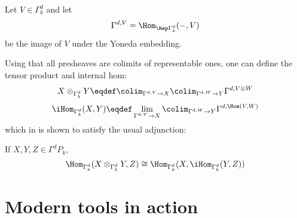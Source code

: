 \documentclass[12pt]{article}
\begin{document}
		Let $V\in \Gamma^d_k$ and let
		\[\Gamma^{d,V}=\Hom_{\Rep\Gamma^d_k}(-,V)\]
		be the image of $V$ under the Yoneda embedding.

		Using that all presheaves are colimits of representable ones, one can define the tensor product and internal hom:
		\[X\otimes_{\Gamma^d_k}Y\eqdef \colim_{\Gamma^{d,V}\to X}\colim_{\Gamma^{d,W}\to Y}\Gamma^{d,V\otimes W}\]
		\[\iHom_{\Gamma^d_k}(X,Y)\eqdef \lim_{\Gamma^{d,V}\to X}\colim_{\Gamma^{d,W}\to Y}\Gamma^{d,\Hom(V,W)}\]
		which in \cite[prop 2.4]{krause-strict-poly-func} is shown to satisfy the usual adjunction:
		\begin{prop}[Krause]
			If $X,Y,Z\in\Gamma^dP_k$, 
			\[\Hom_{\Gamma^d_k}(X\otimes_{\Gamma^d_k} Y,Z)\cong\Hom_{\Gamma^d_k}(X,\iHom_{\Gamma^d_k}(Y,Z))\]
		\end{prop}

\section{Modern tools in action}
\end{document}
